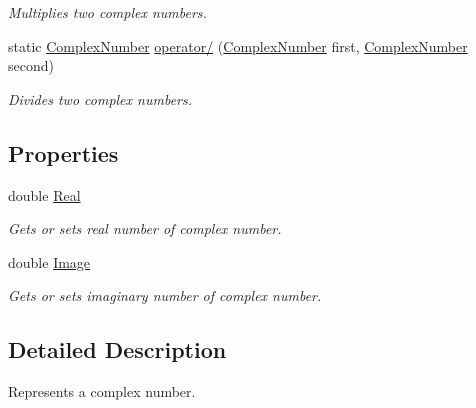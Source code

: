 \begin{DoxyCompactItemize}
\begin{DoxyCompactList}\small\item\em Multiplies two complex numbers. \end{DoxyCompactList}\item 
static \mbox{\hyperlink{class_test_project_1_1_task_library_1_1_tasks_1_1_lesson1_1_1_models_1_1_complex_number}{Complex\+Number}} \mbox{\hyperlink{class_test_project_1_1_task_library_1_1_tasks_1_1_lesson1_1_1_models_1_1_complex_number_adb1b3fae446217b2cb750ac97f8bbe90}{operator/}} (\mbox{\hyperlink{class_test_project_1_1_task_library_1_1_tasks_1_1_lesson1_1_1_models_1_1_complex_number}{Complex\+Number}} first, \mbox{\hyperlink{class_test_project_1_1_task_library_1_1_tasks_1_1_lesson1_1_1_models_1_1_complex_number}{Complex\+Number}} second)
\begin{DoxyCompactList}\small\item\em Divides two complex numbers. \end{DoxyCompactList}\end{DoxyCompactItemize}
\subsection*{Properties}
\begin{DoxyCompactItemize}
\item 
double \mbox{\hyperlink{class_test_project_1_1_task_library_1_1_tasks_1_1_lesson1_1_1_models_1_1_complex_number_abda10c8011cd9fbac931c3b1a22744d7}{Real}}
\begin{DoxyCompactList}\small\item\em Gets or sets real number of complex number. \end{DoxyCompactList}\item 
double \mbox{\hyperlink{class_test_project_1_1_task_library_1_1_tasks_1_1_lesson1_1_1_models_1_1_complex_number_af7ab8389b5539588fce8be03a4d0ba7c}{Image}}
\begin{DoxyCompactList}\small\item\em Gets or sets imaginary number of complex number. \end{DoxyCompactList}\end{DoxyCompactItemize}


\subsection{Detailed Description}
Represents a complex number. 



